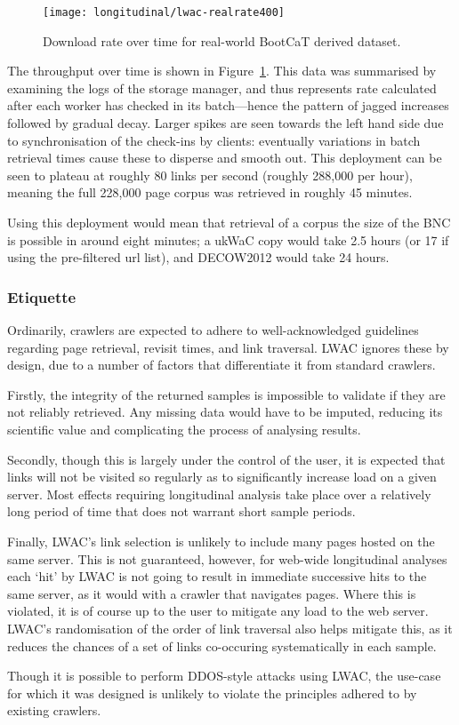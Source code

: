 \begin{figure}[ht]
    \centering
    \texttt{[image: longitudinal/lwac-realrate400]}
    \caption{Download rate over time for real-world BootCaT derived dataset.}
    \label{fig:longitudinal:lwac:realrate400}
\end{figure}

The throughput over time is shown in Figure~\ref{fig:longitudinal:lwac:realrate400}.  This data was summarised by examining the logs of the storage manager, and thus represents rate calculated after each worker has checked in its batch---hence the pattern of jagged increases followed by gradual decay.  Larger spikes are seen towards the left hand side due to synchronisation of the check-ins by clients: eventually variations in batch retrieval times cause these to disperse and smooth out.  This deployment can be seen to plateau at roughly 80 links per second (roughly 288,000 per hour), meaning the full 228,000 page corpus was retrieved in roughly 45 minutes.

Using this deployment would mean that retrieval of a corpus the size of the BNC is possible in around eight minutes; a ukWaC\cite{ferraresi2008introducing} copy would take 2.5 hours (or 17 if using the pre-filtered url list), and DECOW2012\cite{schafer8building} would take 24 hours.





\subsubsection{Etiquette}
Ordinarily, crawlers are expected to adhere to well-acknowledged guidelines regarding page retrieval, revisit times, and link traversal.  LWAC ignores these by design, due to a number of factors that differentiate it from standard crawlers.

Firstly, the integrity of the returned samples is impossible to validate if they are not reliably retrieved.  Any missing data would have to be imputed, reducing its scientific value and complicating the process of analysing results.

Secondly, though this is largely under the control of the user, it is expected that links will not be visited so regularly as to significantly increase load on a given server.  Most effects requiring longitudinal analysis take place over a relatively long period of time that does not warrant short sample periods.

Finally, LWAC's link selection is unlikely to include many pages hosted on the same server.  This is not guaranteed, however, for web-wide longitudinal analyses each `hit' by LWAC is not going to result in immediate successive hits to the same server, as it would with a crawler that navigates pages.  Where this is violated, it is of course up to the user to mitigate any load to the web server.  LWAC's randomisation of the order of link traversal also helps mitigate this, as it reduces the chances of a set of links co-occuring systematically in each sample.

Though it is possible to perform DDOS-style attacks using LWAC, the use-case for which it was designed is unlikely to violate the principles adhered to by existing crawlers.







